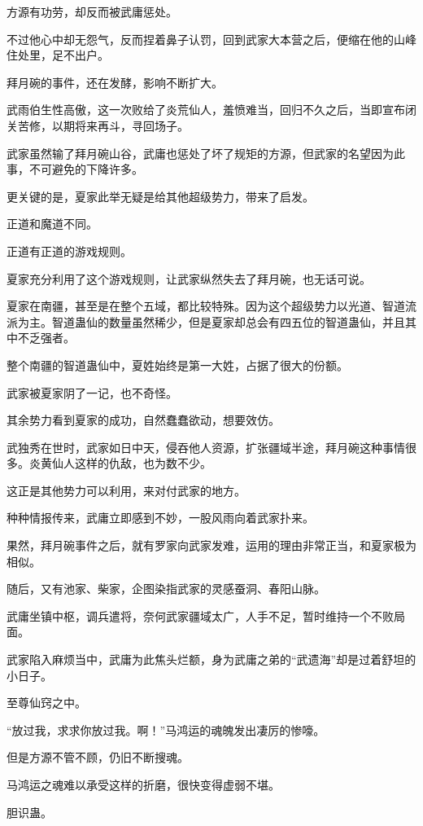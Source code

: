 \begin{this_body}
方源有功劳，却反而被武庸惩处。

不过他心中却无怨气，反而捏着鼻子认罚，回到武家大本营之后，便缩在他的山峰住处里，足不出户。

拜月碗的事件，还在发酵，影响不断扩大。

武雨伯生性高傲，这一次败给了炎荒仙人，羞愤难当，回归不久之后，当即宣布闭关苦修，以期将来再斗，寻回场子。

武家虽然输了拜月碗山谷，武庸也惩处了坏了规矩的方源，但武家的名望因为此事，不可避免的下降许多。

更关键的是，夏家此举无疑是给其他超级势力，带来了启发。

正道和魔道不同。

正道有正道的游戏规则。

夏家充分利用了这个游戏规则，让武家纵然失去了拜月碗，也无话可说。

夏家在南疆，甚至是在整个五域，都比较特殊。因为这个超级势力以光道、智道流派为主。智道蛊仙的数量虽然稀少，但是夏家却总会有四五位的智道蛊仙，并且其中不乏强者。

整个南疆的智道蛊仙中，夏姓始终是第一大姓，占据了很大的份额。

武家被夏家阴了一记，也不奇怪。

其余势力看到夏家的成功，自然蠢蠢欲动，想要效仿。

武独秀在世时，武家如日中天，侵吞他人资源，扩张疆域半途，拜月碗这种事情很多。炎黄仙人这样的仇敌，也为数不少。

这正是其他势力可以利用，来对付武家的地方。

种种情报传来，武庸立即感到不妙，一股风雨向着武家扑来。

果然，拜月碗事件之后，就有罗家向武家发难，运用的理由非常正当，和夏家极为相似。

随后，又有池家、柴家，企图染指武家的灵感蚕洞、春阳山脉。

武庸坐镇中枢，调兵遣将，奈何武家疆域太广，人手不足，暂时维持一个不败局面。

武家陷入麻烦当中，武庸为此焦头烂额，身为武庸之弟的“武遗海”却是过着舒坦的小日子。

至尊仙窍之中。

“放过我，求求你放过我。啊！”马鸿运的魂魄发出凄厉的惨嚎。

但是方源不管不顾，仍旧不断搜魂。

马鸿运之魂难以承受这样的折磨，很快变得虚弱不堪。

胆识蛊。


\end{this_body}
